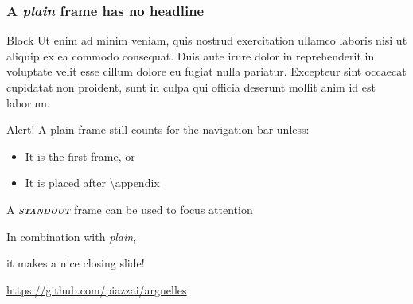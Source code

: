 \documentclass{beamer}
\begin{document}
  \begin{frame}[plain]
    \frametitle{A \textit{plain} frame has no headline}
    \begin{block}{Block}
      Ut enim ad minim veniam, quis nostrud exercitation ullamco laboris nisi ut aliquip ex ea commodo consequat. Duis aute irure dolor in reprehenderit in voluptate velit esse cillum dolore eu fugiat nulla pariatur. Excepteur sint occaecat cupidatat non proident, sunt in culpa qui officia deserunt mollit anim id est laborum.
    \end{block}
    \vfill
    \begin{alert}{Alert!}
      A plain frame still counts for the navigation bar unless:
      \begin{itemize}
        \item It is the first frame, or
        \item It is placed after \textsf{\textbackslash appendix}
      \end{itemize}
    \end{alert}
  \end{frame}

  \begin{frame}[standout]
    \Large
    A \textbf{\itshape\scshape standout} frame can be used to focus attention
  \end{frame}

  \appendix
  \begin{frame}
    In combination with \textit{plain},\par
    it makes a nice closing slide!
    \vfill\scalebox{4}{\faGithub}\par\bigskip
    \url{https://github.com/piazzai/arguelles}
  \end{frame}
\end{document}
